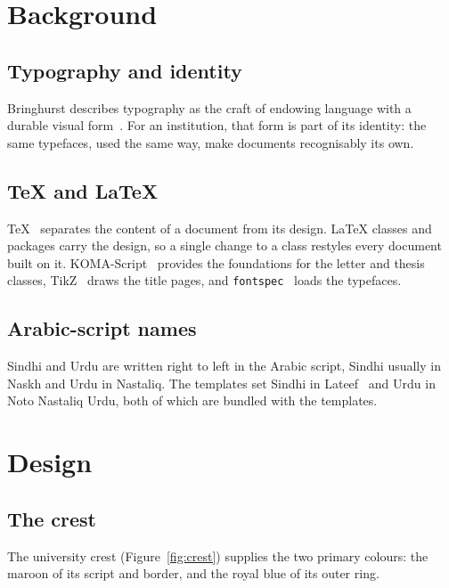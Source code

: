 \documentclass[degree=bs,bib=ieee]{saus-thesis}
\begin{document}
\chapter{Background}\label{ch:background}

\section{Typography and identity}

Bringhurst describes typography as the craft of endowing language with a
durable visual form~\cite{bringhurst2012}. For an institution, that form is
part of its identity: the same typefaces, used the same way, make documents
recognisably its own.

\section{\TeX{} and \LaTeX{}}

\TeX{}~\cite{knuth1984} separates the content of a document from its design.
\LaTeX{} classes and packages carry the design, so a single change to a class
restyles every document built on it. KOMA-Script~\cite{kohm-koma} provides the
foundations for the letter and thesis classes, TikZ~\cite{tantau-tikz} draws the
title pages, and \texttt{fontspec}~\cite{robertson-fontspec} loads the typefaces.

\section{Arabic-script names}

Sindhi and Urdu are written right to left in the Arabic script, Sindhi usually
in Naskh and Urdu in Nastaliq. The templates set Sindhi in Lateef~\cite{sil-lateef}
and Urdu in Noto Nastaliq Urdu, both of which are bundled with the templates.

\chapter{Design}\label{ch:design}

\section{The crest}

The university crest (Figure~\ref{fig:crest}) supplies the two primary colours:
the maroon of its script and border, and the royal blue of its outer ring.
\end{document}
